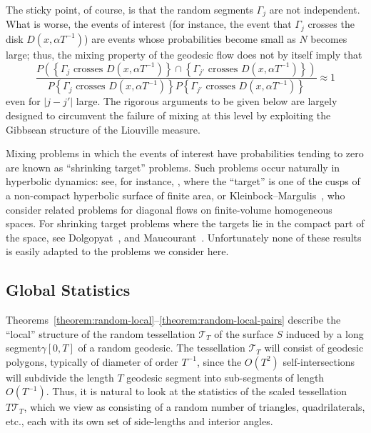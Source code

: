 \documentclass[10pt]{amsart}
\theoremstyle{definition}\newtheorem{defi}[theo]{Definition}\newtheorem{rema}[theo]{Remark}\newtheorem{exam}[theo]{Example}\newtheorem{exem}[theo]{Example}\newtheorem{nota}[theo]{Notation}
\newcommand{\xset}[1]{\left\{ #1 \right\}}
\begin{document}
The sticky point, of course, is that the random segments $\Gamma_{j}$ are not independent. What is worse, the events of interest (for instance, the event that $\Gamma_{j}$ crosses the disk $D(x,\alpha T^{-1})$) are events whose probabilities become small as $N$ becomes large; thus, the mixing property of the geodesic flow does not by itself imply that
\[
\frac{P (\xset {\Gamma_{j} \text{ crosses } D(x,\alpha T^{-1})}\cap \xset {\Gamma_{j'} \text{ crosses } D(x,\alpha T^{-1})})}{P \xset {\Gamma_{j} \text{ crosses } D(x,\alpha T^{-1})}P \xset {\Gamma_{j'} \text { crosses }D(x,\alpha T^{-1})}} \approx 1
\]
even for $|j-j'| $ large. The rigorous arguments to be given below are largely designed to circumvent the failure of mixing at this level by exploiting the Gibbsean structure of the Liouville measure.

Mixing problems in which the events of interest have probabilities tending to zero are known as ``shrinking target'' problems. Such problems occur naturally in hyperbolic dynamics: see, for instance, \cite{Sullivan}, where the ``target'' is one of the cusps of a non-compact hyperbolic surface of finite area, or Kleinbock--Margulis~\cite{KM}, who consider related problems for diagonal flows on finite-volume homogeneous spaces. For shrinking target problems where the targets lie in the compact part of the space, see Dolgopyat~\cite{Dolgopyat2}, and Maucourant~\cite{Maucourant}. Unfortunately none of these results is easily adapted to the problems we consider here.



\subsection{Global Statistics}\label{ssec:global}

Theorems~\ref{theorem:random-local}--\ref{theorem:random-local-pairs} describe the ``local'' structure of the random tessellation $\mathcal{T}_{T}$ of the surface $S$ induced by a long segment$\gamma[0,T]$ of a random geodesic. The tessellation $\mathcal{T}_{T}$ will consist of geodesic polygons, typically of diameter of order $T^{-1}$, since the $O (T^{2})$ self-intersections will subdivide the length $T$ geodesic segment into sub-segments of length $O (T^{-1})$. Thus, it is natural to look at the statistics of the scaled tessellation $T\mathcal{T}_{T}$, which we view as consisting of a random number of triangles, quadrilaterals, etc., each with its own set of side-lengths and interior angles.
\end{document}
